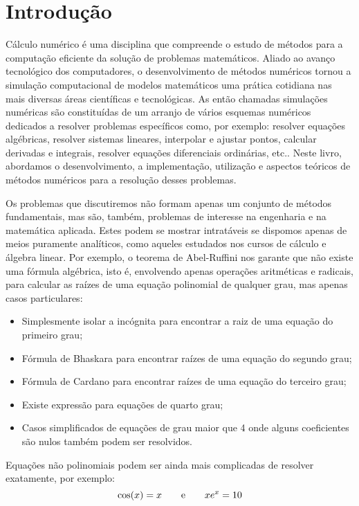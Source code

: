 \documentclass[main.tex]{subfiles}
\begin{document}
\chapter{Introdução}

Cálculo numérico é uma disciplina que compreende o estudo de métodos para a computação eficiente da solução de problemas matemáticos. Aliado ao avanço tecnológico dos computadores, o desenvolvimento de métodos numéricos tornou a simulação computacional de modelos matemáticos uma prática cotidiana nas mais diversas áreas científicas e tecnológicas. As então chamadas simulações numéricas são constituídas de um arranjo de vários esquemas numéricos dedicados a resolver problemas específicos como, por exemplo: resolver equações algébricas, resolver sistemas lineares, interpolar e ajustar pontos, calcular derivadas e integrais, resolver equações diferenciais ordinárias, etc.. Neste livro, abordamos o desenvolvimento, a implementação, utilização e aspectos teóricos de métodos numéricos para a resolução desses problemas.

Os problemas que discutiremos não formam apenas um conjunto de métodos fundamentais, mas são, também, problemas de interesse na engenharia e na matemática aplicada. Estes podem se mostrar intratáveis se dispomos apenas de meios puramente analíticos, como aqueles estudados nos cursos de cálculo e álgebra linear. Por exemplo, o teorema de Abel-Ruffini nos garante que não existe uma fórmula algébrica, isto é, envolvendo apenas operações aritméticas e radicais, para calcular as raízes de uma equação polinomial de qualquer grau, mas apenas casos particulares:
\begin{itemize}
\item Simplesmente isolar a incógnita para encontrar a raiz de uma equação do primeiro grau;
\item Fórmula de Bhaskara para encontrar raízes de uma equação do segundo grau;
\item Fórmula de Cardano para encontrar raízes de uma equação do terceiro grau;
\item Existe expressão para equações de quarto grau;
\item Casos simplificados de equações de grau maior que 4 onde alguns coeficientes são nulos também podem ser resolvidos.
\end{itemize}
Equações não polinomiais podem ser ainda mais complicadas de resolver exatamente, por exemplo:
$$
\cos(x)=x\qquad \hbox{e}\qquad xe^x= 10
$$
\end{document}
